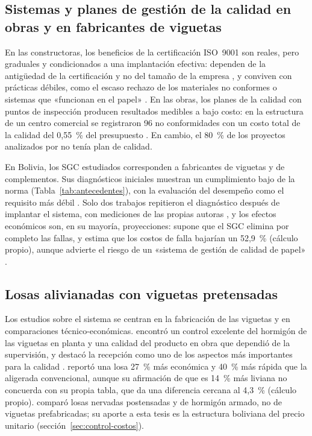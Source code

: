 \subsection{Sistemas y planes de gestión de la calidad en obras y en fabricantes de viguetas}

En las constructoras, los beneficios de la certificación ISO~9001 son reales, pero graduales y condicionados a una implantación efectiva: dependen de la antigüedad de la certificación y no del tamaño de la empresa \parencite[pp.~161--164]{pradoroman2018}, y conviven con prácticas débiles, como el escaso rechazo de los materiales no conformes \parencite[pp.~1139--1140]{shaikh2020} o sistemas que «funcionan en el papel» \parencite[pp.~202, 209]{romero2007}. En las obras, los planes de la calidad con puntos de inspección producen resultados medibles a bajo costo: en la estructura de un centro comercial se registraron 96 no conformidades con un costo total de la calidad del 0,55~\% del presupuesto \parencite[pp.~16--17, 49]{muro2020}. En cambio, el 80~\% de los proyectos analizados por \textcite[p.~80]{gudiel2020} no tenía plan de calidad.

En Bolivia, los SGC estudiados corresponden a fabricantes de viguetas y de complementos. Sus diagnósticos iniciales muestran un cumplimiento bajo de la norma (Tabla~\ref{tab:antecedentes}), con la evaluación del desempeño como el requisito más débil \parencite[p.~48]{mamanicalsina2025} \parencite[p.~77]{pajarito2015}. Solo dos trabajos repitieron el diagnóstico después de implantar el sistema, con mediciones de las propias autoras \parencite[p.~134]{pajarito2015} \parencite[p.~130]{mamanigutierrez2018}, y los efectos económicos son, en su mayoría, proyecciones: \textcite[p.~110]{mamanicalsina2025} supone que el SGC elimina por completo las fallas, y \textcite[pp.~142--143]{pajarito2015} estima que los costos de falla bajarían un 52,9~\% (cálculo propio), aunque advierte el riesgo de un «sistema de gestión de calidad de papel» \parencite[p.~148]{pajarito2015}.

\subsection{Losas alivianadas con viguetas pretensadas}

Los estudios sobre el sistema se centran en la fabricación de las viguetas y en comparaciones técnico-económicas. \textcite[pp.~58, 150]{alcon2009} encontró un control excelente del hormigón de las viguetas en planta y una calidad del producto en obra que dependió de la supervisión, y destacó la recepción como uno de los aspectos más importantes para la calidad \parencite[p.~115]{alcon2009}. \textcite[pp.~48--49]{castaneda2017} reportó una losa 27~\% más económica y 40~\% más rápida que la aligerada convencional, aunque su afirmación de que es 14~\% más liviana no concuerda con su propia tabla, que da una diferencia cercana al 4,3~\% (cálculo propio). \textcite[pp.~268--271]{cocarico2022} comparó losas nervadas postensadas y de hormigón armado, no de viguetas prefabricadas; su aporte a esta tesis es la estructura boliviana del precio unitario (sección~\ref{sec:control-costos}).

